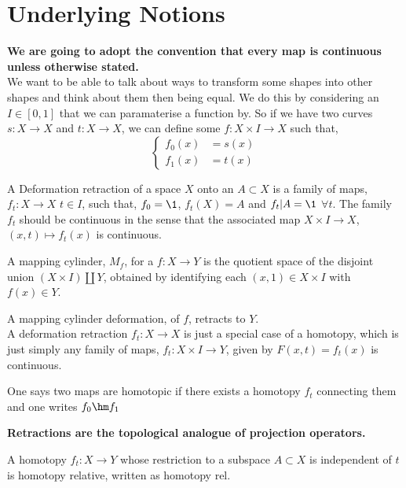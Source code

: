 \section{Underlying Notions}
{\centering \textbf{We are going to adopt the convention that every map is continuous unless otherwise stated.}}\\

\noindent
We want to be able to talk about ways to transform some shapes into other shapes and think about them then being equal. We do this by considering an $I \in [0, 1]$ that we can paramaterise a function by. So if we have two curves $s : X \to X$ and $t : X \to X$, we can define some $f : X \times I \to X$ such that,
$$ \begin{cases}
  f_0(x) &= s(x) \\
  f_1(x) &= t(x)
\end{cases} $$

\begin{ndefi}
  A Deformation retraction of a space $X$ onto an $A \subset X$ is a family of maps, $f_t : X \to X$ $t \in I$, such that, $f_0 = \1$, $f_t(X) = A$ and $f_t | A = \1$ $\forall t$. The family $f_t$ should be continuous in the sense that the associated map $X \times I \to X$, $(x, t) \mapsto f_t(x)$ is continuous.
\end{ndefi}

\begin{ndefi}
  A mapping cylinder, $M_f$, for a $f : X \to Y$ is the quotient space of the disjoint union $(X \times I)\coprod Y$, obtained by identifying each $(x, 1) \in X \times I$ with $f(x) \in Y$.
\end{ndefi}

A mapping cylinder deformation, of $f$, retracts to $Y$.\\

A deformation retraction $f_t : X \to X$ is just a special case of a homotopy, which is just simply any family of maps, $f_t : X \times I \to Y$, given by $F(x, t) = f_t (x)$ is continuous.

\begin{ndefi}[Homotopic]
  One says two maps are homotopic if there exists a homotopy $f_t$ connecting them and one writes $f_0 \hm f_1$
\end{ndefi}

\textbf{Retractions are the topological analogue of projection operators.}

\begin{ndefi}
  A homotopy $f_t : X \to Y$ whose restriction to a subspace $A \subset X$ is independent of $t$ is homotopy relative, written as homotopy rel.
\end{ndefi}


